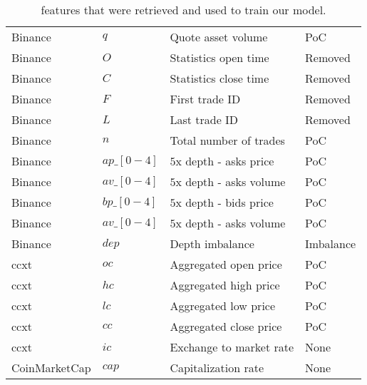 \begin{table}
\begin{tabular}{|l|l|l|l|}
            Binance         & $q$           & Quote asset volume            & PoC       \\
            Binance         & $O$           & Statistics open time          & Removed   \\
            Binance         & $C$           & Statistics close time         & Removed   \\
            Binance         & $F$           & First trade ID                & Removed   \\
            Binance         & $L$           & Last trade ID                 & Removed   \\
            Binance         & $n$           & Total number of trades        & PoC       \\
            Binance         & $ap\_[0-4]$   & $5$x depth - asks price       & PoC       \\
            Binance         & $av\_[0-4]$   & $5$x depth - asks volume      & PoC       \\
            Binance         & $bp\_[0-4]$   & $5$x depth - bids price       & PoC       \\
            Binance         & $av\_[0-4]$   & $5$x depth - asks volume      & PoC       \\
            Binance         & $dep$         & Depth imbalance               & Imbalance \\
            ccxt            & $oc$          & Aggregated open price         & PoC       \\
            ccxt            & $hc$          & Aggregated high price         & PoC       \\
            ccxt            & $lc$          & Aggregated low price          & PoC       \\
            ccxt            & $cc$          & Aggregated close price        & PoC       \\
            ccxt            & $ic$          & Exchange to market rate       & None      \\
            CoinMarketCap   & $cap$         & Capitalization rate           & None      \\
    \hline
    \end{tabular}
    \caption[Features used]{features that were retrieved and used to train our model.}
    \label{tab:feature_table}
\end{table}
